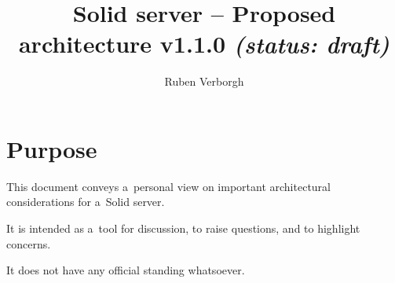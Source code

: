 \documentclass[10pt]{article}
\title{
  Solid server -- Proposed architecture v1.1.0
  \it (status: draft)
}
\author{Ruben Verborgh}
\begin{document}
\maketitle

\section*{Purpose}
This document conveys a~personal view
on important architectural considerations for a~Solid server.

It is intended as a~tool for discussion,
to raise questions,
and to highlight concerns.

It does not have any official standing whatsoever.

\newcommand\ResourceStoreBody{%
  + getRepresentation(ResourceIdentifier, RepresentationPreferences) : Promise<Representation>\\
  + addResource(container : ResourceIdentifier, Representation) : Promise<ResourceIdentifier>\\
  + setRepresentation(ResourceIdentifier, Representation) : Promise<void>\\
  + deleteResource(ResourceIdentifier) : Promise<void>\\
  + modifyResource(ResourceIdentifier, Patch) : Promise<void>\\
}
\end{document}
